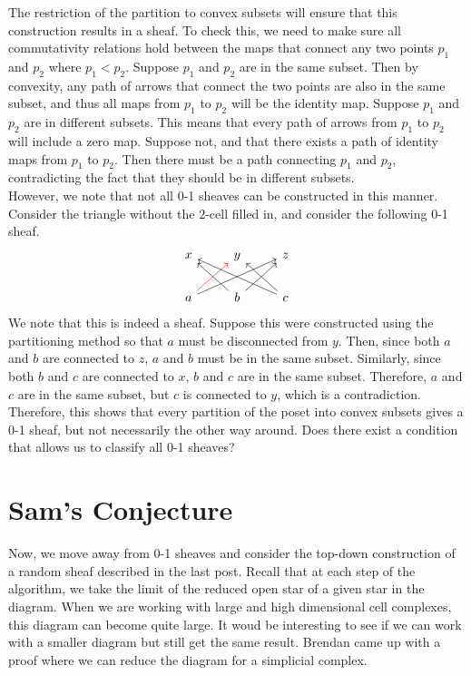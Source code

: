 \documentclass{article}
\theoremstyle{definition}
\begin{document}
The restriction of the partition to convex subsets will ensure that this construction results in a sheaf. To check this, we need to make sure all commutativity relations hold between the maps that connect any two points $p_1$ and $p_2$ where $p_1 < p_2$. Suppose $p_1$ and $p_2$ are in the same subset. Then by convexity, any path of arrows that connect the two points are also in the same subset, and thus all maps from $p_1$ to $p_2$ will be the identity map. Suppose $p_1$ and $p_2$ are in different subsets. This means that every path of arrows from $p_1$ to $p_2$ will include a zero map. Suppose not, and that there exists a path of identity maps from $p_1$ to $p_2$. Then there must be a path connecting $p_1$ and $p_2$, contradicting the fact that they should be in different subsets.\\

However, we note that not all 0-1 sheaves can be constructed in this manner. Consider the triangle without the $2$-cell filled in, and consider the following 0-1 sheaf.
\[
\begin{tikzcd}
	x & y & z \\
	a \arrow[red]{ur} \arrow{urr} & b\arrow{ur} \arrow{ul} & c \arrow{ul} \arrow{ull}
\end{tikzcd}
\]
We note that this is indeed a sheaf. Suppose this were constructed using the partitioning method so that $a$ must be disconnected from $y$. Then, since both $a$ and $b$ are connected to $z$, $a$ and $b$ must be in the same subset. Similarly, since both $b$ and $c$ are connected to $x$, $b$ and $c$ are in the same subset. Therefore, $a$ and $c$ are in the same subset, but $c$ is connected to $y$, which is a contradiction. \\

Therefore, this shows that every partition of the poset into convex subsets gives a 0-1 sheaf, but not necessarily the other way around. Does there exist a condition that allows us to classify all 0-1 sheaves?

\section{Sam's Conjecture}
Now, we move away from 0-1 sheaves and consider the top-down construction of a random sheaf described in the last post. Recall that at each step of the algorithm, we take the limit of the reduced open star of a given star in the diagram. When we are working with large and high dimensional cell complexes, this diagram can become quite large. It woud be interesting to see if we can work with a smaller diagram but still get the same result. Brendan came up with a proof where we can reduce the diagram for a simplicial complex.
\end{document}
